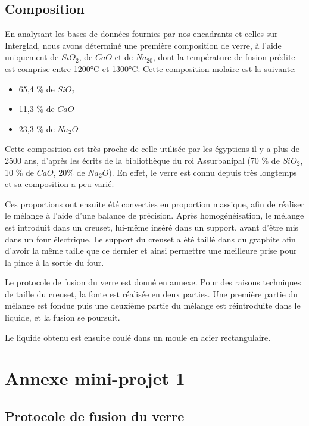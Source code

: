 \documentclass{article}
\begin{document}
\subsection{Composition}

En analysant les bases de données fournies par nos encadrants et celles sur Interglad, nous avons déterminé une première composition de verre, à l'aide uniquement de $SiO_2$, de $CaO$ et de $Na_20$, dont la température de fusion prédite est comprise entre 1200°C et 1300°C. Cette composition molaire est la suivante:

\begin{itemize}
    \item 65,4 \% de $SiO_2$
    \item 11,3 \% de $CaO$
    \item 23,3 \% de $Na_2O$
\end{itemize}

Cette composition est très proche de celle utilisée par les égyptiens il y a plus de 2500 ans, d’après les écrits de la bibliothèque du roi Assurbanipal (70 \% de $SiO_2$, 10 \% de $CaO$, 20\% de $Na_2O$). En effet, le verre est connu depuis très longtemps et sa composition a peu varié. 

Ces proportions ont ensuite été converties en proportion massique, afin de réaliser le mélange à l'aide d'une balance de précision. Après homogénéisation, le mélange est introduit dans un creuset, lui-même inséré dans un support, avant d'être mis dans un four électrique. Le support du creuset a été taillé dans du graphite afin d'avoir la même taille que ce dernier et ainsi permettre une meilleure prise pour la pince à la sortie du four.

Le protocole de fusion du verre est donné en annexe. Pour des raisons techniques de taille du creuset, la fonte est réalisée en deux parties. Une première partie du mélange est fondue puis une deuxième partie du mélange est réintroduite dans le liquide, et la fusion se poursuit.

Le liquide obtenu est ensuite coulé dans un moule en acier rectangulaire.

\section{Annexe mini-projet 1}
\subsection{Protocole de fusion du verre}
\end{document}
